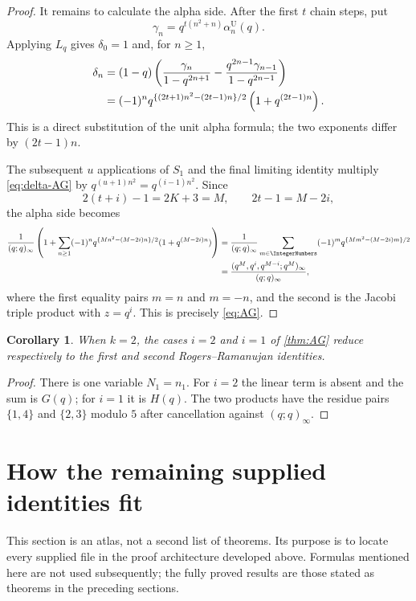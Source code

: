 \documentclass[11pt]{article}
\theoremstyle{blueplain}
\newtheorem{corollary}[theorem]{Corollary}
\theoremstyle{bluedef}
\begin{document}
\begin{proof}
It remains to calculate the alpha side.  After the first $t$ chain steps, put
\[
\gamma_n=q^{t(n^2+n)}\alpha_n^{\mathrm U}(q).
\]
Applying $L_q$ gives $\delta_0=1$ and, for $n\ge1$,
\begin{align}
\delta_n
&=(1-q)\left(
\frac{\gamma_n}{1-q^{2n+1}}
-\frac{q^{2n-1}\gamma_{n-1}}{1-q^{2n-1}}
\right) \notag\\
&=(-1)^nq^{\{(2t+1)n^2-(2t-1)n\}/2}
\left(1+q^{(2t-1)n}\right). \label{eq:delta-AG}
\end{align}
This is a direct substitution of the unit alpha formula; the two exponents differ by $(2t-1)n$.

The subsequent $u$ applications of $S_1$ and the final limiting identity multiply \eqref{eq:delta-AG} by $q^{(u+1)n^2}=q^{(i-1)n^2}$.  Since
\[
2(t+i)-1=2K+3=M,
\qquad
2t-1=M-2i,
\]
the alpha side becomes
\begin{align*}
\frac1{(q;q)_\infty}
\left(
1+\sum_{n\ge1}(-1)^n
q^{\{Mn^2-(M-2i)n\}/2}
(1+q^{(M-2i)n})
\right)
&=\frac1{(q;q)_\infty}
\sum_{m\in\IntegerNumbers}(-1)^m
q^{\{Mm^2-(M-2i)m\}/2}\\
&=\frac{(q^M,q^i,q^{M-i};q^M)_\infty}
{(q;q)_\infty},
\end{align*}
where the first equality pairs $m=n$ and $m=-n$, and the second is the Jacobi triple product with $z=q^i$.  This is precisely \eqref{eq:AG}.
\end{proof}

\begin{corollary}
When $k=2$, the cases $i=2$ and $i=1$ of \cref{thm:AG} reduce respectively to the first and second Rogers--Ramanujan identities.
\end{corollary}

\begin{proof}
There is one variable $N_1=n_1$.  For $i=2$ the linear term is absent and the sum is $G(q)$; for $i=1$ it is $H(q)$.  The two products have the residue pairs $\{1,4\}$ and $\{2,3\}$ modulo $5$ after cancellation against $(q;q)_\infty$.
\end{proof}

\section{How the remaining supplied identities fit}

This section is an atlas, not a second list of theorems.  Its purpose is to locate every supplied file in the proof architecture developed above.  Formulas mentioned here are not used subsequently; the fully proved results are those stated as theorems in the preceding sections.
\end{document}
